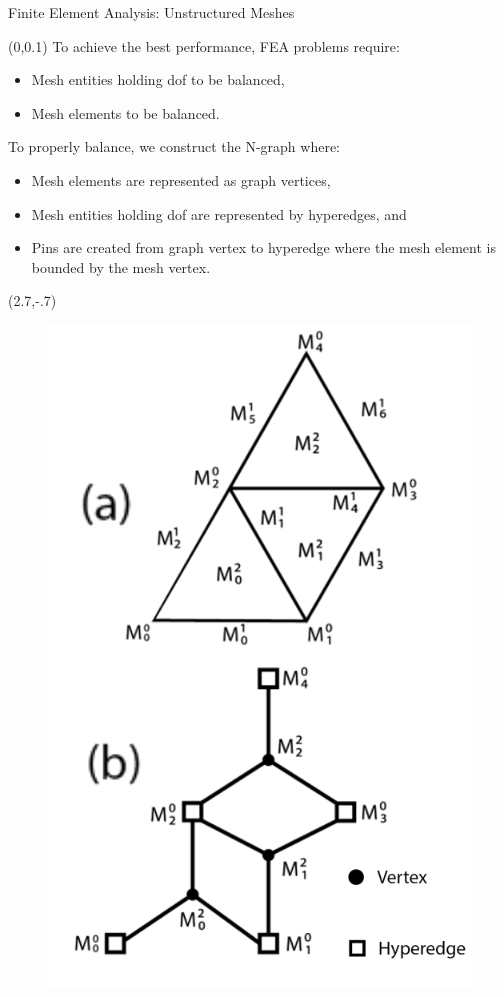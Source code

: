 \documentclass{beamer}
\begin{document}
\begin{textblock}{15.6}
\begin{textblock}{5.1}
\begin{block}{\centering Finite Element Analysis: Unstructured Meshes}
      \begin{textblock}{3.2}(0,0.1)
        To achieve the best performance, FEA problems require:
        \begin{itemize}
        \item Mesh entities holding dof to be balanced,
        \item Mesh elements to be balanced.
        \end{itemize}
        To properly balance, we construct the N-graph where:
        \begin{itemize}
        \item Mesh elements are represented as graph vertices,
        \item Mesh entities holding dof are represented by hyperedges, and
        \item Pins are created from graph vertex to hyperedge where the mesh element is bounded by the mesh vertex.
        \end{itemize}
      \end{textblock}
      \begin{textblock}{2.5}(2.7,-.7)
      \begin{figure}
        \centering
        \includegraphics[width=.75\textwidth]{../figures/mesh2Graph_vert.png}

\end{figure}
\end{textblock}
\end{block}
\end{textblock}
\end{textblock}
\end{document}
